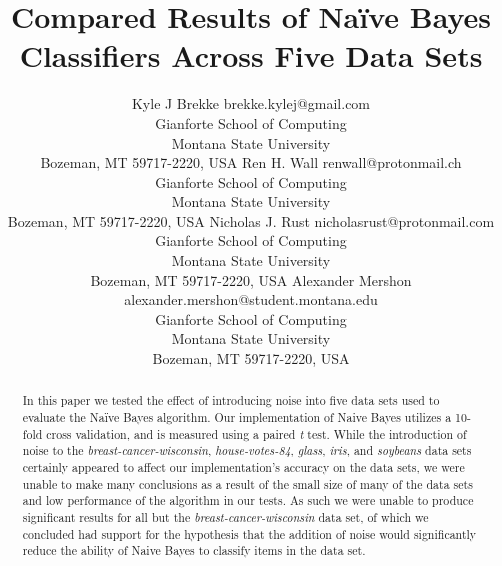 \documentclass[twoside,11pt]{article}
\begin{document}
	
	\title{Compared Results of Naïve Bayes Classifiers Across Five Data Sets}
	
	\author{\name Kyle J Brekke \email brekke.kylej@gmail.com \\
		\addr Gianforte School of Computing\\
		Montana State University\\
		Bozeman, MT 59717-2220, USA
		\AND
		\name Ren H. Wall \email renwall@protonmail.ch \\
		\addr Gianforte School of Computing\\
		Montana State University\\
		Bozeman, MT 59717-2220, USA
		\AND
		\name Nicholas J. Rust \email  nicholasrust@protonmail.com \\
		\addr Gianforte School of Computing\\
		Montana State University\\
		Bozeman, MT 59717-2220, USA
		\AND
		\name Alexander Mershon \email alexander.mershon@student.montana.edu \\
		\addr Gianforte School of Computing\\
		Montana State University\\
		Bozeman, MT 59717-2220, USA}
	
	
	\maketitle
	
	\begin{abstract}%
		In this paper we tested the effect of introducing noise into five data sets used to evaluate the Naïve Bayes algorithm. Our implementation of Naive Bayes utilizes a 10-fold cross validation, and is measured using a paired \textit{t} test. While the introduction of noise to the \textit{breast-cancer-wisconsin}, \textit{house-votes-84}, \textit{glass}, \textit{iris}, and \textit{soybeans} data sets certainly appeared to affect our implementation's accuracy on the data sets, we were unable to make many conclusions as a result of the small size of many of the data sets and low performance of the algorithm in our tests. As such we were unable to produce significant results for all but the \textit{breast-cancer-wisconsin} data set, of which we concluded had support for the hypothesis that the addition of noise would significantly reduce the ability of Naive Bayes to classify items in the data set.
	\end{abstract}
	
\end{document}
